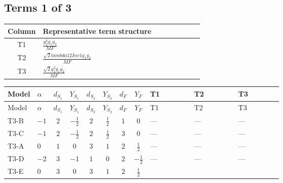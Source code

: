 \documentclass[8pt]{article}
\begin{document}
\begin{landscape}
\subsection*{Terms 1 of 3}
\begin{center}
\begin{tabular}{@{}c >{\raggedright\arraybackslash}p{0.82\linewidth}@{}}
\toprule
Column & Representative term structure \\
\midrule
T1 & \(\displaystyle \frac{g_{2}^{2} \overline{y_{1}} \overline{y_{2}}}{MF}\) \\
\midrule
T2 & \(\displaystyle \frac{\sqrt{2} lambda12Inv1 \overline{y_{1}} \overline{y_{2}}}{MF}\) \\
\midrule
T3 & \(\displaystyle \frac{\sqrt{2} g_{1}^{2} \overline{y_{1}} \overline{y_{2}}}{MF}\) \\
\midrule
\bottomrule
\end{tabular}
\end{center}
\smallskip
\tiny
\begin{longtable}{@{}llcccccc >{\raggedright\arraybackslash}p{0.21\linewidth} >{\raggedright\arraybackslash}p{0.21\linewidth} >{\raggedright\arraybackslash}p{0.21\linewidth}@{}}
\toprule
Model & $\alpha$ & $d_{S_1}$ & $Y_{S_1}$ & $d_{S_2}$ & $Y_{S_2}$ & $d_F$ & $Y_F$ & T1 & T2 & T3 \\
\midrule
\endfirsthead
\toprule
Model & $\alpha$ & $d_{S_1}$ & $Y_{S_1}$ & $d_{S_2}$ & $Y_{S_2}$ & $d_F$ & $Y_F$ & T1 & T2 & T3 \\
\midrule
\endhead
T3-B & $-1$ & $2$ & $-\frac{1}{2}$ & $2$ & $\frac{1}{2}$ & $1$ & $0$ & --- & --- & --- \\
\midrule
T3-C & $-1$ & $2$ & $-\frac{1}{2}$ & $2$ & $\frac{1}{2}$ & $3$ & $0$ & --- & --- & --- \\
\midrule
T3-A & $0$ & $1$ & $0$ & $3$ & $1$ & $2$ & $\frac{1}{2}$ & --- & --- & --- \\
\midrule
T3-D & $-2$ & $3$ & $-1$ & $1$ & $0$ & $2$ & $-\frac{1}{2}$ & --- & --- & --- \\
\midrule
T3-E & $0$ & $3$ & $0$ & $3$ & $1$ & $2$ & $\frac{1}{2}$ & \scriptsize\adjustbox{max width=\linewidth}{$\begin{gathered} \frac{g_{2}^{2} \overline{y_{1}} \overline{y_{2}}}{MF}\end{gathered}$} & \scriptsize\adjustbox{max width=\linewidth}{$\begin{gathered} - \frac{\sqrt{2} lambda12Inv1 \overline{y_{1}} \overline{y_{2}}}{4 MF}\end{gathered}$} & \scriptsize\adjustbox{max width=\linewidth}{$\begin{gathered} \frac{3 \sqrt{2} g_{1}^{2} \overline{y_{1}} \overline{y_{2}}}{16 MF}\end{gathered}$} \\
\midrule
\bottomrule
\end{longtable}
\clearpage

\end{landscape}
\end{document}
